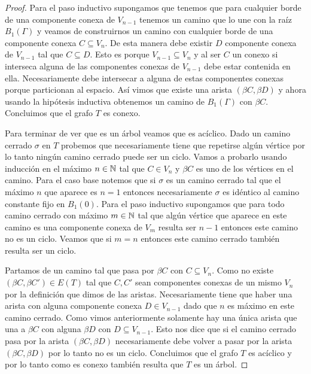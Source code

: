 \documentclass[tesis.tex]{subfiles}
\begin{document}
\begin{proof}
Para el paso inductivo supongamos que tenemos que para cualquier borde de una componente conexa de $V_{n-1}$ tenemos un camino que lo une con la raíz $B_1(\Gamma)$ y veamos de construirnos un camino con cualquier borde de una componente conexa $C \subseteq V_n$.
De esta manera debe existir $D$ componente conexa de $V_{n-1}$ tal que $C \subseteq D$. Esto es porque $V_{n-1} \subseteq V_{n}$ y al ser $C$ un conexo si interseca alguna de las componentes conexas de $V_{n-1}$ debe estar contenida en ella. 
Necesariamente debe intersecar a alguna de estas componentes conexas porque particionan al espacio.
Así vimos que existe una arista $(\beta C, \beta D)$ y ahora usando la hipótesis inductiva obtenemos un camino de $B_1(\Gamma)$ con $\beta C$.
Concluimos que el grafo $T$ es conexo.   

Para terminar de ver que es un árbol veamos que es acíclico. 
Dado un camino cerrado $\sigma$ en $T$ probemos que necesariamente tiene que repetirse algún vértice por lo tanto ningún camino cerrado puede ser un ciclo. Vamos a probarlo usando inducción en el máximo $n \in \mathbb N$ tal que $C \in V_n$ y $\beta C$ es uno de los vértices en el camino. 
Para el caso base notemos que si $\sigma$ es un camino cerrado tal que el máximo $n$ que aparece es $n=1$ entonces necesariamente $\sigma$ es idéntico al camino constante fijo en $B_1(0)$.
Para el paso inductivo supongamos que para todo camino cerrado con máximo $m \in \mathbb N$ tal que algún vértice que aparece en este camino es una componente conexa de $V_m$ resulta ser $n-1$ entonces este camino no es un ciclo. Veamos que si $m=n$ entonces este camino cerrado también resulta ser un ciclo.

Partamos de un camino tal que pasa por $\beta C$ con $C \subseteq V_n$. 
Como no existe $(\beta C, \beta C') \in E(T)$ tal que $C,C'$ sean componentes conexas de un mismo $V_n$ por la definición que dimos de las aristas. Necesariamente tiene que haber una arista con alguna componente conexa $D \in V_{n-1}$ dado que $n$ es máximo en este camino cerrado.   
Como vimos anteriormente solamente hay una única arista que una a $\beta C$ con alguna $\beta D$ con $D \subseteq V_{n-1}$. 
Esto nos dice que si el camino cerrado pasa por la arista $(\beta C, \beta D)$ necesariamente debe volver a pasar por la arista $(\beta C, \beta D)$ por lo tanto no es un ciclo. 
Concluimos que el grafo $T$ es acíclico y por lo tanto como es conexo también resulta que $T$ es un árbol.


\end{proof}
\end{document}

